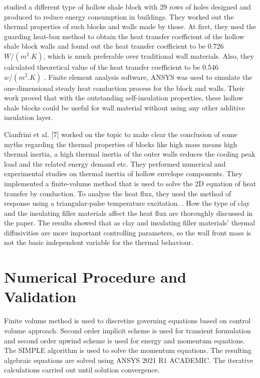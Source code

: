 \documentclass{article}
\begin{document}
\begin{multicols}{2}
\textcite{bai2017study} studied a different type of hollow shale block with 29 rows of holes designed and produced to reduce energy consumption in buildings. They worked out the thermal properties of such blocks and walls made by those. At first, they used the guarding heat-box method to obtain the heat transfer coefficient of the hollow shale block walls and found out the heat transfer coefficient to be 0.726 $W/(m^2.K)$, which is much preferable over traditional wall materials. Also, they calculated theoretical value of the heat transfer coefficient to be 0.546 $w/(m^2.K)$ . Finite element analysis software, ANSYS was used to simulate the one-dimensional steady heat conduction process for the block and walls. Their work proved that with the outstanding self-insulation properties, these hollow shale blocks could be useful for wall material without using any other additive insulation layer.

Cianfrini et al. [7] worked on the topic to make clear the conclusion of some myths regarding the thermal properties of blocks like high mass means high thermal inertia, a high thermal inertia of the outer walls reduces the cooling peak load and the related energy demand etc.  They performed numerical and experimental studies on thermal inertia of hollow envelope components. They implemented a finite-volume method that is used to solve the 2D equation of heat transfer by conduction. To analyse the heat flux, they used the method of response using a triangular-pulse temperature excitation. . How the type of clay and the insulating filler materials affect the heat flux are thoroughly discussed in the paper. The results showed that as clay and insulating filler materials’ thermal diffusivities are more important controlling parameters, so the wall front mass is not the basic independent variable for the thermal behaviour.


\section{Numerical Procedure and Validation}
Finite volume method is used to discretize governing equations based on control volume approach. Second order implicit scheme is used for transient formulation and second order upwind scheme is used for energy and momentum equations. The SIMPLE algorithm is used to solve the momentum equations. The resulting algebraic equations are solved using ANSYS 2021 R1 ACADEMIC. The iterative calculations carried out until solution convergence.



\end{multicols}
\end{document}
